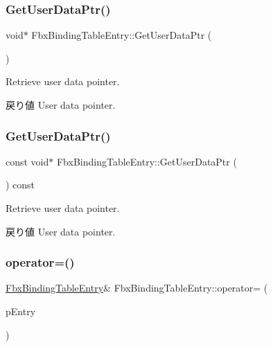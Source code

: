 \subsubsection{\texorpdfstring{Get\+User\+Data\+Ptr()}{GetUserDataPtr()}\hspace{0.1cm}{\footnotesize\ttfamily [1/2]}}
{\footnotesize\ttfamily void$\ast$ Fbx\+Binding\+Table\+Entry\+::\+Get\+User\+Data\+Ptr (\begin{DoxyParamCaption}{ }\end{DoxyParamCaption})}

Retrieve user data pointer. \begin{DoxyReturn}{戻り値}
User data pointer. 
\end{DoxyReturn}
\mbox{\label{class_fbx_binding_table_entry_aa9f5f5064caf0f961464d2555e3336ba}} 
\subsubsection{\texorpdfstring{Get\+User\+Data\+Ptr()}{GetUserDataPtr()}\hspace{0.1cm}{\footnotesize\ttfamily [2/2]}}
{\footnotesize\ttfamily const void$\ast$ Fbx\+Binding\+Table\+Entry\+::\+Get\+User\+Data\+Ptr (\begin{DoxyParamCaption}{ }\end{DoxyParamCaption}) const}

Retrieve user data pointer. \begin{DoxyReturn}{戻り値}
User data pointer. 
\end{DoxyReturn}
\mbox{\label{class_fbx_binding_table_entry_ae1019a3507f988ab66e09adb93326ae4}} 
\subsubsection{\texorpdfstring{operator=()}{operator=()}}
{\footnotesize\ttfamily \hyperlink{class_fbx_binding_table_entry}{Fbx\+Binding\+Table\+Entry}\& Fbx\+Binding\+Table\+Entry\+::operator= (\begin{DoxyParamCaption}\item[{const \hyperlink{class_fbx_binding_table_entry}{Fbx\+Binding\+Table\+Entry} \&}]{p\+Entry }\end{DoxyParamCaption})}


